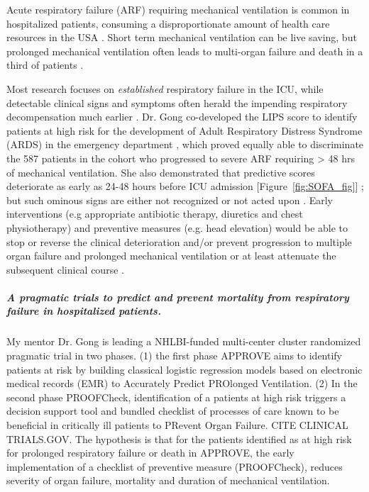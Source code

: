 \documentclass[11pt,notitlepage]{article}
\begin{document}
Acute respiratory failure (ARF) requiring mechanical ventilation is common in hospitalized patients, consuming a disproportionate amount of health care resources in the USA \cite{Wunsch_20639743}. Short term mechanical ventilation can be live saving, but prolonged mechanical ventilation often leads to multi-organ failure and death in a third of patients \cite{Wunsch_20639743, Ranieri_10872010}.

Most research focuses on \textit{established} respiratory failure in the ICU, while detectable clinical signs and symptoms often herald the impending respiratory decompensation much earlier \cite{Rohde_23401431}. Dr. Gong co-developed the LIPS score to identify patients at high risk for the development of Adult Respiratory Distress Syndrome (ARDS) in the emergency department \cite{Herridge_12594312}, which proved equally able to discriminate the 587 patients in the cohort who progressed to severe ARF requiring > 48 hrs of mechanical ventilation. She also demonstrated that predictive scores deteriorate as early as 24-48 hours before ICU admission  [Figure~\ref{fig:SOFA_fig}] \cite{Yu_24970344}; but such ominous signs are either not recognized or not acted upon \cite{Hillman_12415452,McQuillan_9632403}. Early interventions (e.g appropriate antibiotic therapy, diuretics and chest physiotherapy) and preventive measures (e.g. head elevation) would be able to stop or reverse the clinical deterioration and/or prevent progression to multiple organ failure and prolonged mechanical ventilation or at least attenuate the subsequent clinical course \cite{Naeem_16150531,Rivers_11794169,Rivers_12594312,Mitchell_20378235}. 

\subparagraph{A pragmatic trials to predict and prevent mortality from respiratory failure in hospitalized patients.}  My mentor Dr. Gong is leading a NHLBI-funded multi-center cluster randomized pragmatic trial in two phases. (1) the first phase APPROVE aims to identify patients at risk by building classical logistic regression models based on electronic medical records (EMR) to Accurately Predict PROlonged Ventilation. (2) In the second phase PROOFCheck, identification of a patients at high risk triggers a decision support tool and bundled checklist of processes of care known to be beneficial in critically ill patients to PRevent Organ Failure. CITE CLINICAL TRIALS.GOV. The hypothesis is that for the patients identified as at high risk for prolonged respiratory failure or death in APPROVE, the early implementation of a checklist of preventive measure (PROOFCheck), reduces severity of organ failure, mortality and duration of mechanical ventilation. 
\end{document}
